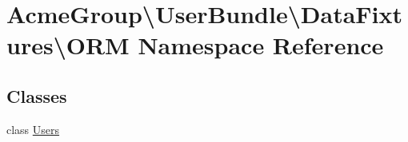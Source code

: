 \hypertarget{namespace_acme_group_1_1_user_bundle_1_1_data_fixtures_1_1_o_r_m}{\section{Acme\+Group\textbackslash{}User\+Bundle\textbackslash{}Data\+Fixtures\textbackslash{}O\+R\+M Namespace Reference}
\label{namespace_acme_group_1_1_user_bundle_1_1_data_fixtures_1_1_o_r_m}
}
\subsection*{Classes}
\begin{DoxyCompactItemize}
\item 
class \hyperlink{class_acme_group_1_1_user_bundle_1_1_data_fixtures_1_1_o_r_m_1_1_users}{Users}
\end{DoxyCompactItemize}
